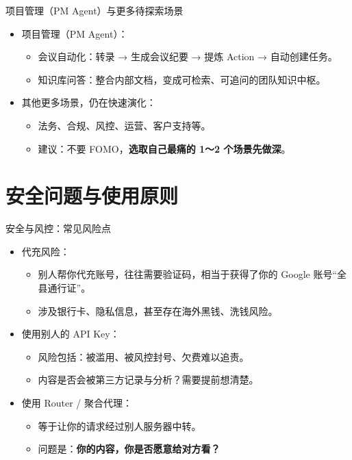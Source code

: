 \documentclass[aspectratio=169]{beamer}
\begin{document}
\begin{frame}{项目管理（PM Agent）与更多待探索场景}
  \begin{itemize}
    \item 项目管理（PM Agent）：
      \begin{itemize}
        \item 会议自动化：转录 → 生成会议纪要 → 提炼 Action → 自动创建任务。
        \item 知识库问答：整合内部文档，变成可检索、可追问的团队知识中枢。
      \end{itemize}
    \item 其他更多场景，仍在快速演化：
      \begin{itemize}
        \item 法务、合规、风控、运营、客户支持等。
        \item 建议：不要 FOMO，\textbf{选取自己最痛的 1～2 个场景先做深}。
      \end{itemize}
  \end{itemize}
\end{frame}

\section{安全问题与使用原则}

\begin{frame}{安全与风控：常见风险点}
  \begin{itemize}
    \item 代充风险：
      \begin{itemize}
        \item 别人帮你代充账号，往往需要验证码，相当于获得了你的 Google 账号“全县通行证”。
        \item 涉及银行卡、隐私信息，甚至存在海外黑钱、洗钱风险。
      \end{itemize}
    \item 使用别人的 API Key：
      \begin{itemize}
        \item 风险包括：被滥用、被风控封号、欠费难以追责。
        \item 内容是否会被第三方记录与分析？需要提前想清楚。
      \end{itemize}
    \item 使用 Router / 聚合代理：
      \begin{itemize}
        \item 等于让你的请求经过别人服务器中转。
        \item 问题是：\textbf{你的内容，你是否愿意给对方看？}
      \end{itemize}
  \end{itemize}
\end{frame}
\end{document}
